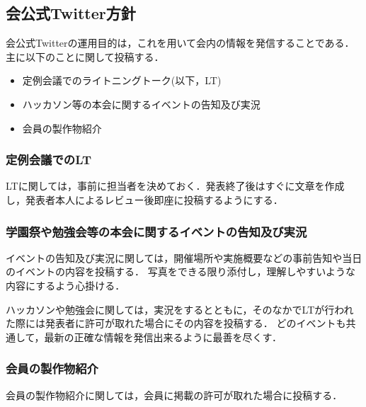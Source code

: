 \subsection*{会公式Twitter方針}


会公式Twitterの運用目的は，これを用いて会内の情報を発信することである．主に以下のことに関して投稿する．
\begin{itemize}
\item 定例会議でのライトニングトーク(以下，LT)
\item ハッカソン等の本会に関するイベントの告知及び実況
\item 会員の製作物紹介
\end{itemize}

\subsubsection*{定例会議でのLT}
LTに関しては，事前に担当者を決めておく．発表終了後はすぐに文章を作成し，発表者本人によるレビュー後即座に投稿するようにする．

\subsubsection*{学園祭や勉強会等の本会に関するイベントの告知及び実況}
イベントの告知及び実況に関しては，開催場所や実施概要などの事前告知や当日のイベントの内容を投稿する．
写真をできる限り添付し，理解しやすいような内容にするよう心掛ける．

ハッカソンや勉強会に関しては，実況をするとともに，そのなかでLTが行われた際には発表者に許可が取れた場合にその内容を投稿する．
どのイベントも共通して，最新の正確な情報を発信出来るように最善を尽くす．

\subsubsection*{会員の製作物紹介}
会員の製作物紹介に関しては，会員に掲載の許可が取れた場合に投稿する．


